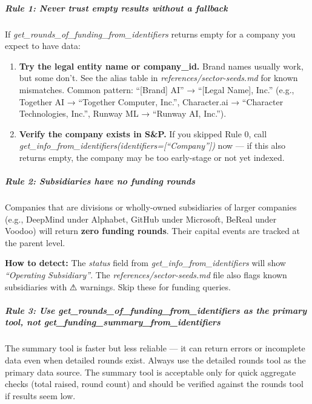 \documentclass[11pt]{article}
\begin{document}
\subparagraph{Rule 1: Never trust empty results without a fallback}\mbox{}\par

If \emph{get\_\allowbreak{}rounds\_\allowbreak{}of\_\allowbreak{}funding\_\allowbreak{}from\_\allowbreak{}identifiers} returns empty for a company you expect to have data:

\begin{enumerate}[leftmargin=*,itemsep=2pt,topsep=2pt]
\item {} \textbf{Try the legal entity name or company\_\allowbreak{}id.} Brand names usually work, but some don't. See the alias table in \emph{references/sector-seeds.md} for known mismatches. Common pattern: ``[Brand] AI'' → ``[Legal Name], Inc.'' (e.g., Together AI → ``Together Computer, Inc.'', Character.ai → ``Character Technologies, Inc.'', Runway ML → ``Runway AI, Inc.'').
\item {} \textbf{Verify the company exists in S\&P.} If you skipped Rule 0, call \emph{get\_\allowbreak{}info\_\allowbreak{}from\_\allowbreak{}identifiers(identifiers=[``Company''])} now — if this also returns empty, the company may be too early-stage or not yet indexed.
\end{enumerate}

\subparagraph{Rule 2: Subsidiaries have no funding rounds}\mbox{}\par

Companies that are divisions or wholly-owned subsidiaries of larger companies (e.g., DeepMind under Alphabet, GitHub under Microsoft, BeReal under Voodoo) will return \textbf{zero funding rounds}. Their capital events are tracked at the parent level.


\textbf{How to detect:} The \emph{status} field from \emph{get\_\allowbreak{}info\_\allowbreak{}from\_\allowbreak{}identifiers} will show \emph{``Operating Subsidiary''}. The \emph{references/sector-seeds.md} file also flags known subsidiaries with ⚠ warnings. Skip these for funding queries.


\subparagraph{Rule 3: Use \emph{get\_\allowbreak{}rounds\_\allowbreak{}of\_\allowbreak{}funding\_\allowbreak{}from\_\allowbreak{}identifiers} as the primary tool, not \emph{get\_\allowbreak{}funding\_\allowbreak{}summary\_\allowbreak{}from\_\allowbreak{}identifiers}}\mbox{}\par

The summary tool is faster but less reliable — it can return errors or incomplete data even when detailed rounds exist. Always use the detailed rounds tool as the primary data source. The summary tool is acceptable only for quick aggregate checks (total raised, round count) and should be verified against the rounds tool if results seem low.
\end{document}
